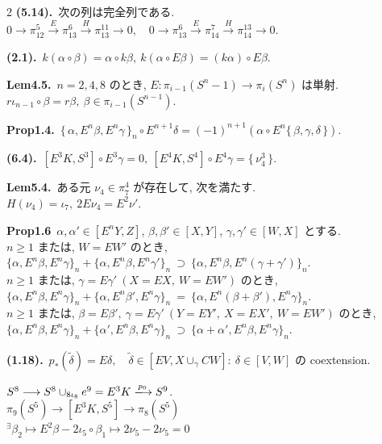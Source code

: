 \documentclass[10pt, leqno]{ltjsarticle}
\newcommand{\Ex}{E}        %
\newcommand{\toda}[1]{\{\,#1\,\}}              %
\newcommand{\todai}[2][]{\{\,#2\,\}_{#1}}      %
\newcommand{\gen}[1]{\{\,#1\,\}}       %
\newcommand{\pis}[2]{\pi_{#1}(#2)}       %
\numberwithin{equation}{section}
\theoremstyle{plain}
\theoremstyle{definition}
\theoremstyle{remark}
\begin{document}
\begin{paracol}{2}
\noindent
\textbf{(5.14).}\
次の列は完全列である.\\
\(
0\to \pi^{5}_{12}\xrightarrow{E}\pi^{6}_{13}\xrightarrow{H}\pi^{11}_{13}\to0,
\quad
0\to \pi^{6}_{13}\xrightarrow{E}\pi^{7}_{14}\xrightarrow{H}\pi^{13}_{14}\to0 .
\)

\noindent
\textbf{(2.1).}\
\(k(\alpha\circ\beta) = \alpha\circ k\beta,\
k(\alpha\circ E\beta) = (k\alpha)\circ E\beta.\)

\noindent
\textbf{Lem4.5.}\
\(n=2,4,8\) のとき, 
\(E:\pis{i-1}{S^n-1}\to\pis{i}{S^n}\) は単射.\\ 
\(r\iota_{n-1}\circ\beta = r\beta,\ \beta\in\pis{i-1}{S^{n-1}}\).

\noindent
\textbf{Prop1.4.}\
\(\todai[n]{\alpha, E^n\beta, E^n\gamma}\circ E^{n+1}\delta
= (-1)^{n+1}(\alpha\circ E^n\toda{\beta, \gamma, \delta})\).

\noindent
\textbf{(6.4).}\
\([E^{3}K, S^{3}] \circ E^{3}\gamma = 0, \
[E^{4}K, S^{4}] \circ E^{4}\gamma = \gen{\nu^{3}_{4}}.\)

\noindent
\textbf{Lem5.4.}\
ある元 \(\nu_{4}\in \pi^{4}_{7}\) が存在して, 次を満たす. \\
\(H(\nu_{4})=\iota_7,\ 2E \nu_{4}=E^{2}\nu' .\)

\noindent
\textbf{Prop1.6}\
$\alpha,\alpha'\in[\Ex^n Y, Z]$, $\beta,\beta'\in[X, Y]$, 
$\gamma,\gamma'\in[W, X]$ とする. \\
$n\ge 1$ または, $W=\Ex W'$ のとき,\\
\(
\{\alpha,\Ex^n\beta,\Ex^n\gamma\}_n
+
\{\alpha,\Ex^n\beta,\Ex^n\gamma'\}_n
\ \supset\
\{\alpha,\Ex^n\beta,\Ex^n(\gamma+\gamma')\}_n.
\)\\
$n\ge 1$ または, $\gamma=\Ex\gamma' \ (X=\Ex X,\ W=\Ex W')$ のとき,\\
\(
\{\alpha,\Ex^n\beta,\Ex^n\gamma\}_n
+
\{\alpha,\Ex^n\beta',\Ex^n\gamma\}_n
\ =\
\{\alpha,\Ex^n(\beta+\beta'),\Ex^n\gamma\}_n.
\)\\
$n\ge 1$ または,
$\beta=\Ex\beta',\ \gamma=\Ex\gamma' \ (Y=\Ex Y',\ X=\Ex X',\ W=\Ex W')$ のとき,\\
\(
\{\alpha,\Ex^n\beta,\Ex^n\gamma\}_n
+
\{\alpha',\Ex^n\beta,\Ex^n\gamma\}_n
\ \supset\
\{\alpha+\alpha',\Ex^n\beta,\Ex^n\gamma\}_n.
\)

\noindent
\textbf{(1.18).}\
\(p_*(\widetilde{\delta}) = E\delta,\quad
\widetilde{\delta}\in[EV, X\cup_\gamma CW]:\
\delta\in [V,W]\) の coextension.

\noindent
\(S^8\longrightarrow 
S^8\cup_{8\iota_8}e^9 = E^3 K \xlongrightarrow{p_0}
S^9\).\\
\(\pis{9}{S^5}\longrightarrow
[E^3 K, S^5]\longrightarrow
\pis{8}{S^5}\)\\
\({}^\exists \beta_2 \longmapsto 
E^2\beta - 2\iota_5\circ\beta_1 \longmapsto
2\nu_5 - 2\nu_5 = 0\)




\end{paracol}
\end{document}
